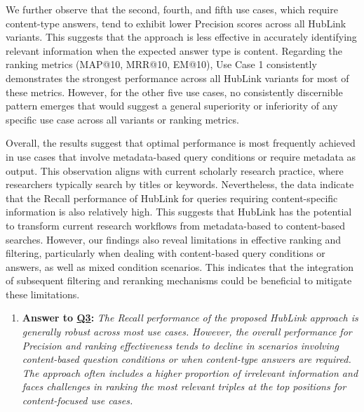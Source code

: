 We further observe that the second, fourth, and fifth use cases, which require content-type answers, tend to exhibit lower Precision scores across all HubLink variants. This suggests that the approach is less effective in accurately identifying relevant information when the expected answer type is content. Regarding the ranking metrics (MAP@10, MRR@10, EM@10), Use Case 1 consistently demonstrates the strongest performance across all HubLink variants for most of these metrics. However, for the other five use cases, no consistently discernible pattern emerges that would suggest a general superiority or inferiority of any specific use case across all variants or ranking metrics.

Overall, the results suggest that optimal performance is most frequently achieved in use cases that involve metadata-based query conditions or require metadata as output. This observation aligns with current scholarly research practice, where researchers typically search by titles or keywords. Nevertheless, the data indicate that the Recall performance of HubLink for queries requiring content-specific information is also relatively high. This suggests that HubLink has the potential to transform current research workflows from metadata-based to content-based searches. However, our findings also reveal limitations in effective ranking and filtering, particularly when dealing with content-based query conditions or answers, as well as mixed condition scenarios. This indicates that the integration of subsequent filtering and reranking mechanisms could be beneficial to mitigate these limitations.



\begin{enumerate}[label={}]
    \item \textbf{Answer to \hyperref[sec:evaluation_gqm_plan]{Q3}:} \textit{The Recall performance of the proposed HubLink approach is generally robust across most use cases. However, the overall performance for Precision and ranking effectiveness tends to decline in scenarios involving content-based question conditions or when content-type answers are required. The approach often includes a higher proportion of irrelevant information and faces challenges in ranking the most relevant triples at the top positions for content-focused use cases.}
\end{enumerate}


